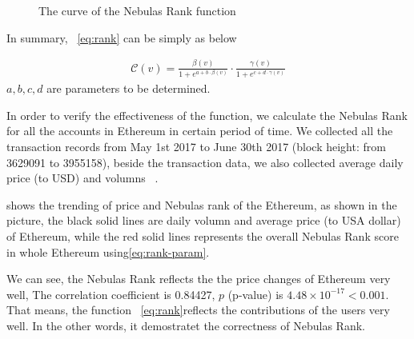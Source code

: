 \begin{figure}
\centering
{}
\caption{The curve of the Nebulas Rank function \label{fig-nr}}
\end{figure}


\vspace{2em}
In summary, ~\ref{eq:rank} can be simply as below

\begin{align}
\label{eq:rank-param}
\mathcal{C}(v) =  \frac{\beta(v)}{1+e^{a + b \cdot \beta(v)}} \cdot \frac{\gamma(v)}{1+e^{c + d \cdot \gamma(v)}}
\end{align}
\noindent $a, b, c, d$ are parameters to be determined.

In order to verify the effectiveness of the function, we calculate the Nebulas Rank for all the accounts in Ethereum in certain period of time. We collected all the transaction records from May 1st 2017 to June 30th 2017 (block height: from 3629091 to 3955158), beside the transaction data, we also collected average daily price (to USD) and volumns ~\cite{coinmarketcap}.

 shows the trending of price and Nebulas rank of the Ethereum, as shown in the picture, the black solid lines are daily volumn and average price (to USA dollar) of Ethereum, while the red solid lines represents the overall Nebulas Rank score in whole Ethereum using\ref{eq:rank-param}.

We can see, the Nebulas Rank reflects the the price changes of Ethereum very well, The correlation coefficient is 0.84427, $p$ (p-value) is $4.48\times{}10^{-17}<0.001$. That means, the function ~\ref{eq:rank}reflects the contributions of the users very well. In the other words, it demostratet the correctness of Nebulas Rank. 

